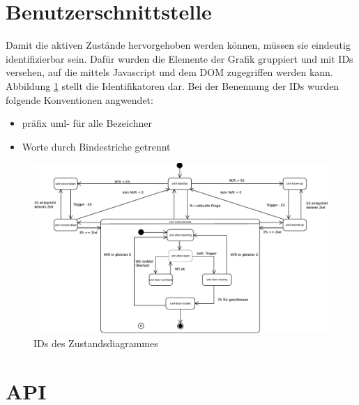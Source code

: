 \section{Benutzerschnittstelle}
Damit die aktiven Zustände hervorgehoben werden können, müssen sie eindeutig identifizierbar sein.
Dafür wurden die Elemente der Grafik gruppiert und mit IDs versehen, auf die mittels Javascript und dem \acrshort{DOM} zugegriffen werden kann.
Abbildung \ref{fig:ZD_id_view} stellt die Identifikatoren dar.
Bei der Benennung der IDs wurden folgende Konventionen angwendet:
\begin{itemize}
	\item präfix uml- für alle Bezeichner
	\item Worte durch Bindestriche getrennt
\end{itemize}

\begin{figure}[hbt]
	\centering
	\includegraphics[width=\textwidth]{images/ZDv6_id_view.eps}
	\caption{IDs des Zustandsdiagrammes}
	\label{fig:ZD_id_view}
\end{figure}

\section{API}
\label{imp_api}

